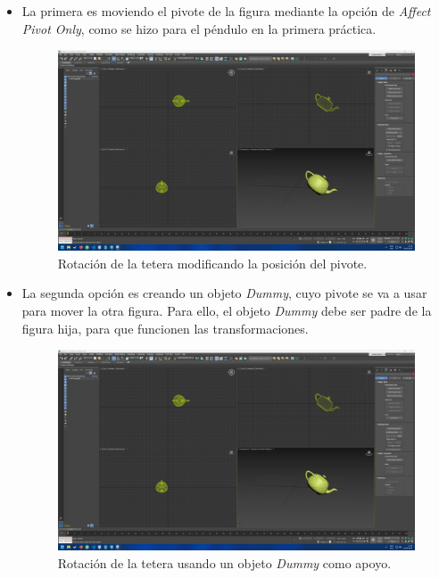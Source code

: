 \documentclass{article}
\begin{document}
\begin{itemize}
    \item La primera es moviendo el pivote de la figura mediante la opción de \textit{Affect Pivot Only}, como se hizo para el péndulo en la primera práctica.
    
    \begin{figure}[H]
        \centering
        \includegraphics[width=\textwidth]{imagenes/tetepivote.png}
        \caption{Rotación de la tetera modificando la posición del pivote.}
     \end{figure}    
    
    \item La segunda opción es creando un objeto \textit{Dummy}, cuyo pivote se va a usar para mover la otra figura. Para ello, el objeto \textit{Dummy} debe ser padre de la figura hija, para que funcionen las transformaciones.
    \begin{figure}[H]
        \centering
        \includegraphics[width=\textwidth]{imagenes/tetepivote.png}
        \caption{Rotación de la tetera usando un objeto \textit{Dummy} como apoyo.}
     \end{figure}    

\end{itemize}
\end{document}

